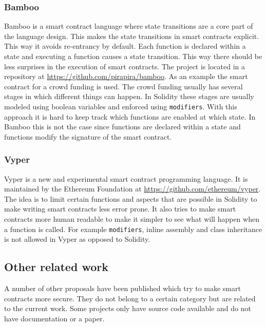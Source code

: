 \documentclass[a4paper]{article}
\begin{document}
\subsubsection{Bamboo}
Bamboo is a smart contract language where state transitions are a core part of the language design. This makes the state transitions in smart contracts explicit. This way it avoids re-entrancy by default. Each function is declared within a state and executing a function causes a state transition. This way there should be less surprises in the execution of smart contracts. The project is located in a repository at \url{https://github.com/pirapira/bamboo}. As an example the smart contract for a crowd funding is used. The crowd funding usually has several stages in which different things can happen. In Solidity these stages are usually modeled using boolean variables and enforced using \texttt{modifiers}. With this approach it is hard to keep track which functions are enabled at which state. In Bamboo this is not the case since functions are declared within a state and functions modify the signature of the smart contract. 
\subsubsection{Vyper}
Vyper is a new and experimental smart contract programming language. It is maintained by the Ethereum Foundation at \url{https://github.com/ethereum/vyper}. The idea is to limit certain functions and aspects that are possible in Solidity to make writing smart contracts less error prone. It also tries to make smart contracts more human readable to make it simpler to see what will happen when a function is called. For example \texttt{modifiers}, inline assembly and class inheritance is not allowed in Vyper as opposed to Solidity. 

\subsection{Other related work}
A number of other proposals have been published which try to make smart contracts more secure. They do not belong to a certain category but are related to the current work. Some projects only have source code available and do not have documentation or a paper.
\end{document}
